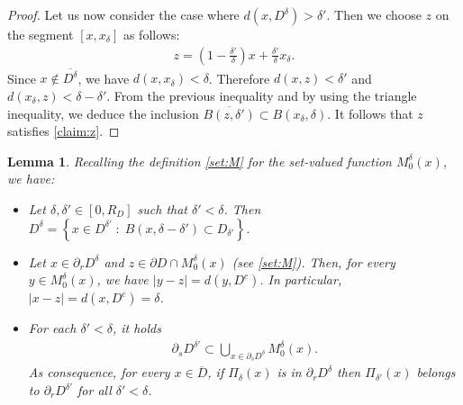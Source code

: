 \documentclass[reqno,11pt]{amsart}
\newtheorem{lemma}[theorem]{Lemma}
\theoremstyle{definition}
\numberwithin{equation}{section}
\def\ov{\overline}
\newcommand{\1}{{{\bf 1}\kern-0,28em\rm l}}
\def\sepa{\; : \;}
\def\proj{\Pi}
\newcommand{\aco}[1]{\left\{#1\right\}}
\begin{document}
\begin{proof}
Let us now consider the case where   $d(x,D^\delta)>\delta'$. Then we choose  $z$ on the segment $[x,x_\delta]$ as follows:
\begin{align*}
z=\left(1-\frac{\delta'}{\delta}\right) x +\frac{\delta'}{\delta} x_\delta.
\end{align*}
Since $x\notin \ov{D^\delta}$, we have $d(x,x_\delta)< \delta$. Therefore
$ d(x,z) < \delta'$ and $d(x_\delta,z) <  \delta-\delta' .$ 
From the previous inequality  and by using the triangle inequality, we deduce  the inclusion $\ov{B(z,\delta')} \subset B(x_\delta,\delta)$. 
It follows that $z$ satisfies \eqref{claim:z}. \end{proof}




\begin{lemma}
\label{Mdd}
Recalling the definition \eqref{set:M} for the set-valued function $M_0^\delta(x)$, we have:
\begin{itemize}[leftmargin=5mm]
\item[(i)] Let $\delta, \delta'\in [0,R_D]$ such that $ \delta' < \delta$. Then
 $D^\delta = \aco{ x\in D^{\delta'} \sepa B(x,\delta-\delta')\subset D_{\delta'}}$. %
\medskip
\item[(ii)] Let $x\in \partial_r D^\delta$ and $z\in \partial D\cap M_0^\delta(x)$ (see \eqref{set:M}). Then, for every $y\in M_0^\delta(x)$, we have  $|y - z| = d(y,D^c)$.
In particular, $|x - z| =d(x,D^c)=\delta$.

\medskip
\item[(iii)] For each $\delta' <\delta$, it holds
\begin{align*}
\partial_s D^{\delta'} \subset \bigcup_{x\in\partial_s D^\delta} M_0^\delta(x).
\end{align*}
As consequence, for every $x\in \ov D$, if $\proj_\delta(x)$ is in $\partial_r D^\delta$ then $\proj_{\delta'}(x)$ belongs to $\partial_r D^{\delta'}$ for all $\delta'<\delta$.
\end{itemize}
\end{lemma}
\end{document}
